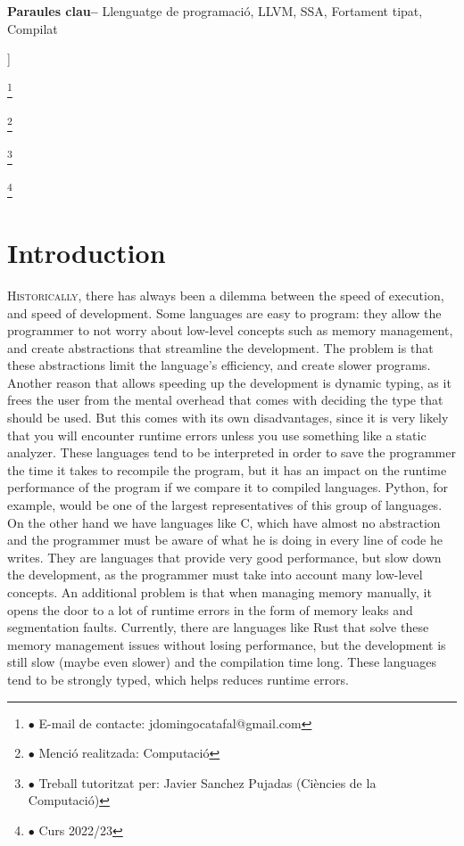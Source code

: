﻿\documentclass[10pt,a4paper,twocolumn,twoside]{article}
\newcommand\blfootnote[1]{%
  \begingroup
  \renewcommand\thefootnote{}\footnote{#1}%
  \addtocounter{footnote}{-1}%
  \endgroup
}
\begin{document}
\begin{@twocolumnfalse}
\begin{center}
{    \bigskip

    \textbf{Paraules clau-- } Llenguatge de programació, LLVM, SSA, Fortament tipat, Compilat
}
\end{center}

\bigskip
\end{@twocolumnfalse}]

\blfootnote{$\bullet$ E-mail de contacte: jdomingocatafal@gmail.com}
\blfootnote{$\bullet$ Menció realitzada: Computació}
\blfootnote{$\bullet$ Treball tutoritzat per: Javier Sanchez Pujadas (Ciències de la Computació)}
\blfootnote{$\bullet$ Curs 2022/23}

\section{Introduction} \lettrine[lines=3]{H}{istorically}, there has always been
a dilemma between the speed of execution, and speed of development. Some
languages are easy to program: they allow the programmer to not worry about
low-level concepts such as memory management, and create abstractions that
streamline the development. The problem is that these abstractions limit the
language's efficiency, and create slower programs. Another reason that allows
speeding up the development is dynamic typing, as it frees the user from the
mental overhead that comes with deciding the type that should be used. But this
comes with its own disadvantages, since it is very likely that you will
encounter runtime errors unless you use something like a static analyzer. These
languages tend to be interpreted in order to save the programmer the time it
takes to recompile the program, but it has an impact on the runtime
performance of the program if we compare it to compiled languages. Python, for
example, would be one of the largest representatives of this group of languages.
On the other hand we have languages like C, which have almost no abstraction and
the programmer must be aware of what he is doing in every line of code he
writes. They are languages that provide very good performance, but slow down the
development, as the programmer must take into account many low-level concepts.
An additional problem is that when managing memory manually, it opens the door
to a lot of runtime errors in the form of memory leaks and segmentation faults.
Currently, there are languages like Rust that solve these memory management
issues without losing performance, but the development is still slow (maybe even
slower) and the compilation time long. These languages tend to be strongly
typed, which helps reduces runtime errors.
\end{document}
